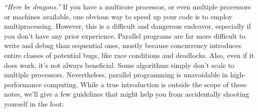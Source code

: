\documentclass[openany,oneside]{report}
\renewenvironment{quote}{\list{}{\leftmargin=8\parindent}\item\relax}{\endlist}
\begin{document}
\begin{quote}\small
  \emph{``Here be dragons.''}
\end{quote}
If you have a multicore processor, or even multiple processors or machines available, one obvious way to speed up your code is to employ multiprocessing.
However, this is a difficult and dangerous endeavor, especially if you don't have any prior experience.
Parallel programs are far more difficult to write and debug than sequential ones, mostly because concurrency introduces entire classes of potential bugs, like race conditions and deadlocks.
Also, even if it does work, it's not always beneficial.
Some algorithms simply don't scale to multiple processors.
Nevertheless, parallel programming is unavoidable in high-performance computing.
While a true introduction is outside the scope of these notes, we'll give a few guidelines that might help you from accidentally shooting yourself in the foot:
\end{document}
